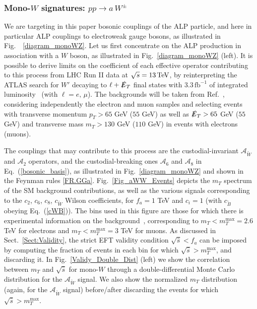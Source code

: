 \documentclass[11pt]{article}
\newcommand{\A}{\mathcal{A}}
\newcommand{\ETmiss}{\slashed{E}_T}
\renewcommand{\to}{\rightarrow}
\renewcommand{\[}{\begin{equation}}
\renewcommand{\]}{\end{equation}}
\newcommand{\tpdf}{\texorpdfstring}
\newcounter{diagram}
\begin{document}
\subsubsection{Mono-\tpdf{$W$}{W} signatures: \tpdf{$pp \to a \, W^{\pm}$}{pp -> a W}}
\label{Sect:monoW-ATLAS}
 
We are targeting in this paper bosonic couplings of the ALP particle,  and here in particular ALP couplings to electroweak gauge bosons, as illustrated 
in Fig.~~\ref{diagram_monoWZ}. 
 Let us first concentrate on the ALP production in association with a $W$ boson, as illustrated in Fig.~\ref{diagram_monoWZ} (left). 
It is possible to derive limits on the coefficient of each effective
operator contributing to this process  from LHC Run II data at $\sqrt s = \unit[13]{TeV}$, 
by reinterpreting the ATLAS search for $W'$ decaying to $\ell + \ETmiss$ final states with $3.3\,\mathrm{fb}^{-1}$ of integrated 
luminosity~\cite{ATLAS-CONF-2015-063} (with $\ell = e,\,\mu$).  The backgrounds will be taken from Ref.~\cite{ATLAS-CONF-2015-063}, considering independently the 
electron and muon samples and selecting events with transverse momentum 
$p_T > 65$ GeV ($55$ GeV) as well as $\ETmiss > 65$ GeV ($55$ GeV) and transverse mass 
$m_T > 130$ GeV ($110$ GeV) in events with electrons (muons).  


The couplings that may contribute to this process are the custodial-invariant $\A_{\tilde{W}}$ and $\A_2$ operators, and the custodial-breaking ones $\A_6$ and $\A_8$ 
in Eq.~(\ref{bosonic_basis}), as  illustrated in Fig.~\ref{diagram_monoWZ} and shown in 
the Feynman rules \ref{FR.GGa}. Fig.~\ref{Fig_aWW_Events} depicts the $m_T$ spectrum of the SM background contributions, as well as 
the various signals corresponding to the $c_2$, $c_6$, $c_8$, $c_{\tilde{W}}$ Wilson coefficients, 
for $f_a = 1$ TeV and $c_i = 1$ (with $c_{\tilde{B}}$ obeying Eq.~(\ref{cWB})). The bins used in this figure are those for which there is experimental information 
on the background~\cite{ATLAS-CONF-2015-063}, corresponding to $m_T < m_T^\text{max} = 2.6$ TeV for electrons and $m_T < m_T^\text{max} =3$ TeV for muons.  
As discussed in Sect.~\ref{Sect:Validity}, the strict EFT validity condition 
$\sqrt{\hat{s}} < f_a$ can be imposed by computing the fraction of events in each bin for which 
$\sqrt{\hat{s}}> m_T^\text{max}$, and discarding it. In Fig.~\ref{Validy_Double_Dist} (left) we show the correlation between $m_T$ and 
$\sqrt{\hat{s}}$ for mono-$W$ through a double-differential Monte Carlo distribution for the $\A_{\tilde{W}}$ signal. 
We also show the normalized $m_T$ distribution (again, for the $\A_{\tilde{W}}$ signal) before/after discarding the events 
for which $\sqrt{\hat{s}}> m_T^\text{max}$.
\end{document}
